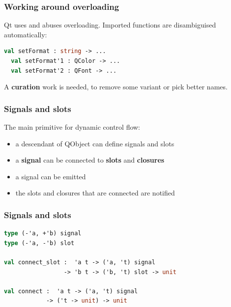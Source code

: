\documentclass[serif,mathserif]{beamer}
\begin{document}
\begin{frame}[fragile]
  \frametitle{Working around overloading}

  Qt uses and abuses overloading.
  Imported functions are disambiguised automatically:

  \begin{lstlisting}[language=Caml,morekeywords={module,sig,end,val}]
  val setFormat : string -> ...
  val setFormat'1 : QColor -> ...
  val setFormat'2 : QFont -> ...
  \end{lstlisting}

  A {\bf curation} work is needed, to remove some variant or pick better names.
\end{frame}

\begin{frame}
  \frametitle{Signals and slots}

  The main primitive for dynamic control flow:

  \begin{itemize}
    \item a descendant of QObject can define signals and slots
    \item a {\bf signal} can be connected to {\bf slots} and {\bf closures}
    \item a signal can be emitted
    \item the slots and closures that are connected are notified
  \end{itemize}
\end{frame}

\begin{frame}[fragile]
  \frametitle{Signals and slots}

\begin{lstlisting}[language=Caml,morekeywords={module,sig,end,val}]
type (-'a, +'b) signal
type (-'a, -'b) slot

val connect_slot :  'a t -> ('a, 't) signal 
                 -> 'b t -> ('b, 't) slot -> unit

val connect :  'a t -> ('a, 't) signal 
            -> ('t -> unit) -> unit
\end{lstlisting}

\end{frame}
\end{document}

